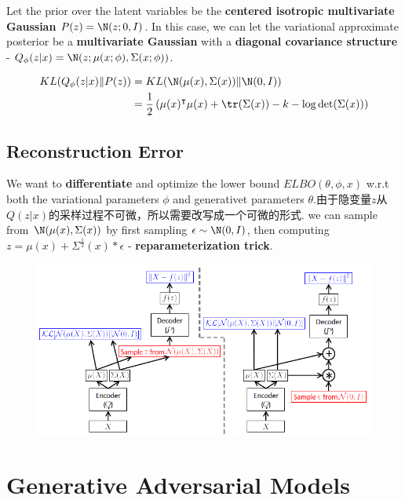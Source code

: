 Let the prior over the latent variables be the \textbf{centered isotropic multivariate Gaussian} $P(z) = \N (z; 0, I)$. In this case, we can
let the variational approximate posterior be a \textbf{multivariate Gaussian} with a \textbf{diagonal covariance structure}
- $Q_{\phi}(z|x) = \N (z; \mu(x; \phi), \Sigma(x; \phi))$.

\begin{equation}
    \begin{split}
        KL(Q_{\phi}(z|x)\|P(z))
        &= KL(\N(\mu(x), \Sigma(x))\|\N(0, I)) \\
        &= \frac{1}{2}\left(\mu(x)^\intercal\mu(x)  + \tr (\Sigma(x)) - k - \log \det (\Sigma(x))\right)
    \end{split}
\end{equation}

\subsection{Reconstruction Error}
We want to \textbf{differentiate} and optimize the lower bound $ELBO(\theta, \phi, x)$ w.r.t both the variational
parameters $\phi$ and generativet parameters $\theta$.由于隐变量$z$从$Q(z|x)$的采样过程不可微，所以需要改写成一个可微的形式.
we can sample from
$\N(\mu(x), \Sigma(x))$ by first sampling $\epsilon \sim \N(0, I)$, then computing
$z = \mu(x) + \Sigma^{\frac{1}{2}}(x) * \epsilon$ - \textbf{reparameterization trick}.

\begin{figure}[H]
    \centering
    \includegraphics[width=12cm]{images/vae_reparameterization_trick.png}
    \label{fig:vae_reparameterization_trick}
\end{figure}

\section{Generative Adversarial Models}

